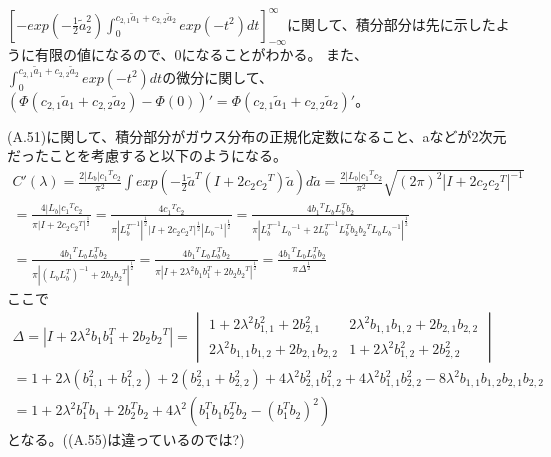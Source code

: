 \documentclass{jsarticle}
\begin{document}
$[- exp(-\frac{1}{2} \tilde{a}_2^2) \int_0^{c_{2,1} \tilde{a}_1 + c_{2,2} \tilde{a}_2} exp(-t^2) dt]_{-\infty}^{\infty}$に関して、積分部分は先に示したように有限の値になるので、0になることがわかる。
また、$\int_0^{c_{2,1} \tilde{a}_1 + c_{2,2} \tilde{a}_2} exp(-t^2) dt$の微分に関して、$(\Phi(c_{2,1} \tilde{a}_1 + c_{2,2} \tilde{a}_2) - \Phi(0))' = \Phi(c_{2,1} \tilde{a}_1 + c_{2,2} \tilde{a}_2)'$。

(A.51)に関して、積分部分がガウス分布の正規化定数になること、aなどが2次元だったことを考慮すると以下のようになる。
\begin{equation}
\begin{split}
C'(\lambda) = \frac{2|L_b|{c_1}^T c_2}{\pi^{2}} \int exp(-\frac{1}{2}\tilde{a}^T(I + 2c_2 {c_2}^T)\tilde{a})d\tilde{a}
= \frac{2|L_b|{c_1}^T c_2}{\pi^{2}} \sqrt{(2\pi)^2 |I + 2c_2 {c_2}^T|^{-1}}\\
= \frac{4|L_b|{c_1}^T c_2}{\pi|I + 2c_2 {c_2}^T|^{\frac{1}{2}}}
= \frac{4{c_1}^T c_2}{\pi|{L_b^T}^{-1}|^{\frac{1}{2}}|I + 2c_2 {c_2}^T|^{\frac{1}{2}}|{L_b}^{-1}|^{\frac{1}{2}}}
= \frac{4{b_1}^T L_b L_b^T b_2}{\pi|{L_b^T}^{-1}{L_b}^{-1} + 2{L_b^T}^{-1}L_b^T b_2 {b_2}^T L_b {L_b}^{-1}|^{\frac{1}{2}}}\\
= \frac{4{b_1}^T L_b L_b^T b_2}{\pi|(L_b L_b^{T})^{-1} + 2b_2 {b_2}^T|^{\frac{1}{2}}}
= \frac{4{b_1}^T L_b L_b^T b_2}{\pi|I + 2\lambda^2 b_1 b_1^T + 2b_2 {b_2}^T|^{\frac{1}{2}}}
= \frac{4{b_1}^T L_b L_b^T b_2}{\pi\Delta^{\frac{1}{2}}}
\end{split}
\end{equation}
ここで
\begin{equation}
\begin{split}
\Delta = |I + 2\lambda^2 b_1 b_1^T + 2b_2 {b_2}^T|
= 
\begin{vmatrix}
1 + 2\lambda^2 b_{1,1}^2 + 2 b_{2,1}^2 & 2\lambda^2 b_{1,1} b_{1, 2} + 2 b_{2, 1} b_{2, 2}\\
2\lambda^2 b_{1,1} b_{1, 2} + 2 b_{2, 1} b_{2, 2} & 1 + 2\lambda^2 b_{1,2}^2 + 2 b_{2,2}^2
\end{vmatrix}\\
= 1 + 2 \lambda (b_{1, 1}^2 + b_{1, 2}^2) + 2(b_{2, 1}^2 + b_{2, 2}^2) + 4\lambda^2 b_{2, 1}^2 b_{1, 2}^2 + 4\lambda^2 b_{1, 1}^2 b_{2, 2}^2 - 8\lambda^2 b_{1, 1} b_{1, 2} b_{2, 1} b_{2, 2}\\
= 1 + 2\lambda^2 b_1^T b_1 + 2 b_2^T b_2 + 4\lambda^2(b_1^T b_1 b_2^T b_2 - (b_1^T b_2)^2)
\end{split}
\end{equation}
となる。((A.55)は違っているのでは?)
\end{document}
